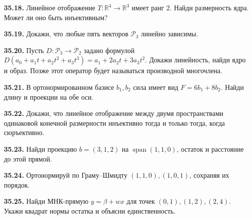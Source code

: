 \noindent\begin{minipage}[t]{\linewidth}\textbf{35.18.} Линейное отображение \(T:\mathbb R^4\to\mathbb R^3\) имеет ранг \(2\). Найди размерность ядра. Может ли оно быть инъективным?\par\end{minipage}\par
\noindent\begin{minipage}[t]{\linewidth}\textbf{35.19.}\starmark{} Докажи, что любые пять векторов \(\mathcal P_3\) линейно зависимы.\par\end{minipage}\par
\noindent\begin{minipage}[t]{\linewidth}\textbf{35.20.}\starmark{} Пусть \(D:\mathcal P_3\to\mathcal P_2\) задано формулой \(D(a_0+a_1t+a_2t^2+a_3t^3)=a_1+2a_2t+3a_3t^2\). Докажи линейность, найди ядро и образ. Позже этот оператор будет называться производной многочлена.\par\end{minipage}\par
\noindent\begin{minipage}[t]{\linewidth}\textbf{35.21.} В ортонормированном базисе \(b_1,b_2\) сила имеет вид \(F=6b_1+8b_2\). Найди длину и проекции на обе оси.\par\end{minipage}\par
\noindent\begin{minipage}[t]{\linewidth}\textbf{35.22.}\starmark{} Докажи, что линейное отображение между двумя пространствами одинаковой конечной размерности инъективно тогда и только тогда, когда сюръективно.\par\end{minipage}\par
\noindent\begin{minipage}[t]{\linewidth}\textbf{35.23.} Найди проекцию \(b=(3,1,2)\) на \(\operatorname{span}(1,1,0)\), остаток и расстояние до этой прямой.\par\end{minipage}\par
\noindent\begin{minipage}[t]{\linewidth}\textbf{35.24.} Ортонормируй по Граму--Шмидту \((1,1,0),(1,0,1)\), сохраняя их порядок.\par\end{minipage}\par
\noindent\begin{minipage}[t]{\linewidth}\textbf{35.25.} Найди МНК-прямую \(y=\beta+wx\) для точек \((0,1),(1,2),(2,4)\). Укажи квадрат нормы остатка и объясни единственность.\par\end{minipage}\par
